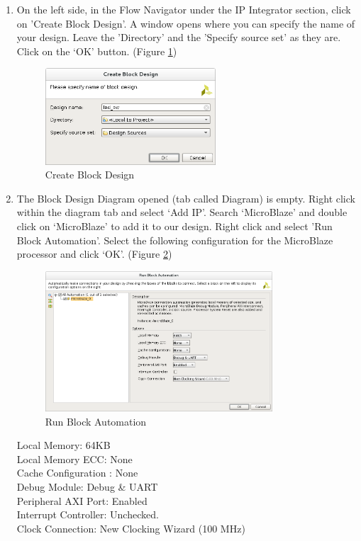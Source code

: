 \documentclass[11pt,twoside,titlepage]{article}
\begin{document}
\begin{enumerate}
\begin{enumerate}
			\item On the left side, in the Flow Navigator under the IP Integrator section, click on 'Create Block Design'. A window opens where you can specify the name of your design. Leave the 'Directory' and the 'Specify source set' as they are. Click on the `OK' button. (Figure \ref{createbd})   
			\begin{figure}[h]
				\begin{center}
					\includegraphics[width=0.6\textwidth]{lab24}
					\caption{Create Block Design}
					\label{createbd}
				\end{center}
			\end{figure}
			\item The Block Design Diagram opened (tab called Diagram) is empty. Right click within the diagram tab and select `Add IP'. Search `MicroBlaze' and double click on `MicroBlaze' to add it to our design. Right click and select 'Run Block Automation'. Select the following configuration for the MicroBlaze processor and click `OK'.
			(Figure \ref{microbla})   
			\begin{figure}[h]
				\begin{center}
					\includegraphics[width=0.8\textwidth]{lab2blockauto}
					\caption{Run Block Automation}
					\label{microbla}
				\end{center}
			\end{figure}
			
			
			Local Memory: 64KB\\
			Local Memory ECC: None\\
			Cache Configuration : None\\
			Debug Module: Debug \& UART\\
			Peripheral AXI Port: Enabled\\
			Interrupt Controller: Unchecked.\\ 
			Clock Connection: New Clocking Wizard (100 MHz)\\
			

\end{enumerate}
\end{enumerate}
\end{document}
